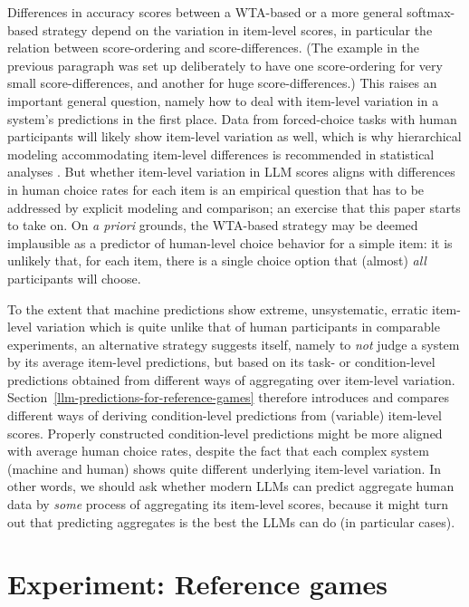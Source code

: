 \documentclass[fleqn]{article}
\begin{document}
Differences in accuracy scores between a WTA-based or a more general softmax-based strategy depend on the variation in item-level scores, in particular the relation between score-ordering and score-differences.
(The example in the previous paragraph was set up deliberately to have one score-ordering for very small score-differences, and another for huge score-differences.)
This raises an important general question, namely how to deal with item-level variation in a system's predictions in the first place.
Data from forced-choice tasks with human participants will likely show item-level variation as well, which is why hierarchical modeling accommodating item-level differences is recommended in statistical analyses \citep[e.g.,][]{Jaeger2008:Categorical-dat,barr2013}.
But whether item-level variation in LLM scores aligns with differences in human choice rates for each item is an empirical question that has to be addressed by explicit modeling and comparison; an exercise that this paper starts to take on.
On \emph{a priori} grounds, the WTA-based strategy may be deemed implausible as a predictor of human-level choice behavior for a simple item: it is unlikely that, for each item, there is a single choice option that (almost) \emph{all} participants will choose.

To the extent that machine predictions show extreme, unsystematic, erratic item-level variation which is quite unlike that of human participants in comparable experiments, an alternative strategy suggests itself, namely to \emph{not} judge a system by its average item-level predictions, but based on its task- or condition-level predictions obtained from different ways of aggregating over item-level variation.
Section~\ref{llm-predictions-for-reference-games} therefore introduces and compares different ways of deriving condition-level predictions from (variable) item-level scores.
Properly constructed condition-level predictions might be more aligned with average human choice rates, despite the fact that each complex system (machine and human) shows quite different underlying item-level variation.
In other words, we should ask whether modern LLMs can predict aggregate human data by \emph{some} process of aggregating its item-level scores, because it might turn out that predicting aggregates is the best the LLMs can do (in particular cases).

\section{Experiment: Reference games}
\label{experiment-reference-games}
\end{document}
